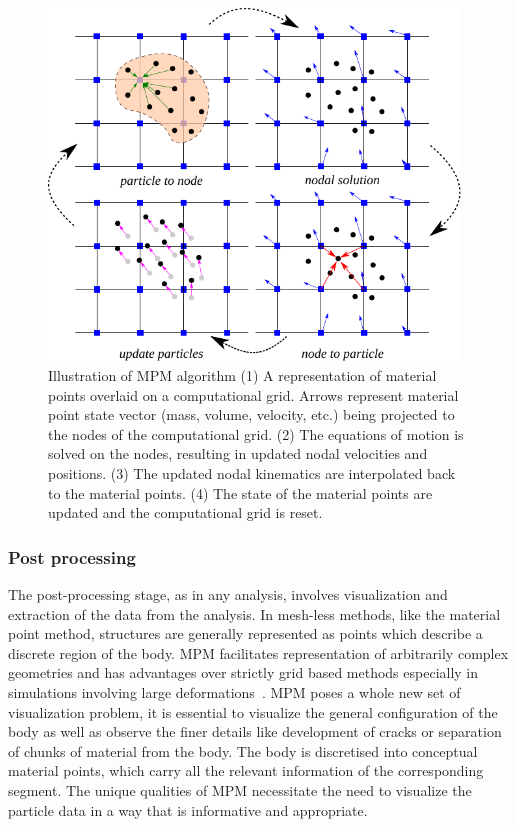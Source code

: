 \begin{figure}[htbp]
\centering
\includegraphics[width=0.975\textwidth]{MPMsteps}
\caption[Illustration of the MPM algorithm]{Illustration of MPM algorithm (1) A 
representation of material points overlaid on a computational grid. Arrows 
represent material point state vector (mass, volume, velocity, etc.) being 
projected to the nodes of the computational grid. (2) The equations of motion 
is solved on the nodes, resulting in updated nodal velocities and positions. 
(3) The updated nodal kinematics are interpolated back to the material points. 
(4)  The state of the material points are updated and the computational grid is 
reset.} 
\label{fig:MPMsteps}
\end{figure}

\subsubsection{Post processing}

The post-processing stage, as in any analysis, involves visualization 
and extraction of the data from the analysis. In mesh-less methods, like the 
material point method, structures are generally represented as points which 
describe a discrete region of the body. MPM facilitates representation of 
arbitrarily complex geometries and has advantages over strictly grid based 
methods especially in simulations involving large 
deformations~\citep{Bardenhagen2000}. MPM poses a whole new set of 
visualization problem, it is essential to visualize the general configuration 
of the body as well as observe the finer details like development of cracks or 
separation of chunks of material from the body. The body is discretised into 
conceptual material points, which carry all the relevant information of the 
corresponding segment. The unique qualities of MPM necessitate the need to 
visualize the particle data in a way that is informative and appropriate.


